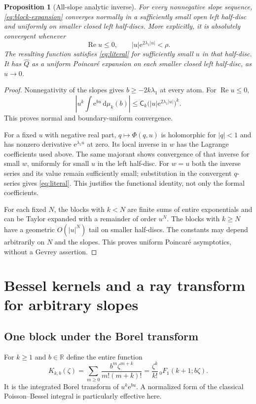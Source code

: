 \documentclass[11pt,a4paper]{article}
\numberwithin{equation}{section}
\newtheorem{proposition}[theorem]{Proposition}
\theoremstyle{definition}
\theoremstyle{remark}
\newcommand{\R}{\mathbb R}
\newcommand{\Q}{\widehat Q}
\newcommand{\ee}{\mathrm e}
\newcommand{\dd}{\mathrm d}
\newcommand{\Ree}{\operatorname{Re}}
\newcommand{\sh}{\mathsf C}
\begin{document}
\begin{proposition}[All-slope analytic inverse]
\label{prop:all-slopes}
For every nonnegative slope sequence, \eqref{eq:block-expansion} converges
normally in a sufficiently small open left half-disc and uniformly on
smaller closed left half-discs.  More explicitly, it is absolutely
convergent whenever
\begin{equation}
 \Ree u\le0,\qquad |u|\ee^{2\lambda_1|u|}<\rho.
 \label{eq:block-domain}
\end{equation}
The resulting function satisfies \eqref{eq:literal} for sufficiently small
$u$ in that half-disc.  It has $\Q$ as a uniform Poincar\'e expansion on
each smaller closed left half-disc, as $u\to0$.
\end{proposition}
\begin{proof}
Nonnegativity of the slopes gives $b\ge-2k\lambda_1$ at every atom.
For $\Ree u\le0$,
\[
 \left|u^k\int\ee^{bu}\,\dd\mu_k(b)\right|
 \le\sh_k\bigl(|u|\ee^{2\lambda_1|u|}\bigr)^k.
\]
This proves normal and boundary-uniform convergence.

For a fixed $u$ with negative real part,
$q\mapsto\Phi(q,u)$ is holomorphic for $|q|<1$ and has nonzero derivative
$\ee^{\lambda_1u}$ at zero.  Its local inverse in $w$ has the Lagrange
coefficients used above.  The same majorant shows convergence of that
inverse for small $w$, uniformly for small $u$ in the left half-disc.
For $w=u$ both the inverse series and its value remain sufficiently small;
substitution in the convergent $q$-series gives \eqref{eq:literal}.
This justifies the functional identity, not only the formal coefficients.

For each fixed $N$, the blocks with $k<N$ are finite sums of entire
exponentials and can be Taylor expanded with a remainder of order $u^N$.
The blocks with $k\ge N$ have a geometric $O(|u|^N)$ tail on smaller
half-discs.  The constants may depend arbitrarily on $N$ and the slopes.
This proves uniform Poincar\'e asymptotics, without a Gevrey assertion.
\end{proof}

\section{Bessel kernels and a ray transform for arbitrary slopes}
\label{sec:bessel}

\subsection{One block under the Borel transform}
For $k\ge1$ and $b\in\R$ define the entire function
\begin{equation}
 K_{k,b}(\zeta)
  =\sum_{m\ge0}\frac{b^m\zeta^{m+k}}{m!(m+k)!}
  =\frac{\zeta^k}{k!}\,{}_0F_1(k+1;b\zeta).
 \label{eq:kernel}
\end{equation}
It is the integrated Borel transform of $u^k\ee^{bu}$.
A normalized form of the classical Poisson--Bessel integral
\cite[Eq.~10.9.4]{dlmf} is particularly effective here.
\end{document}
